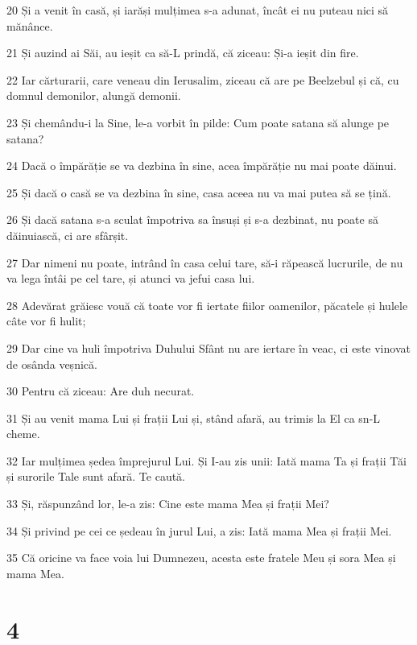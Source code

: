\par 20 Și a venit în casă, și iarăși mulțimea s-a adunat, încât ei nu puteau nici să mănânce.
\par 21 Și auzind ai Săi, au ieșit ca să-L prindă, că ziceau: Și-a ieșit din fire.
\par 22 Iar cărturarii, care veneau din Ierusalim, ziceau că are pe Beelzebul și că, cu domnul demonilor, alungă demonii.
\par 23 Și chemându-i la Sine, le-a vorbit în pilde: Cum poate satana să alunge pe satana?
\par 24 Dacă o împărăție se va dezbina în sine, acea împărăție nu mai poate dăinui.
\par 25 Și dacă o casă se va dezbina în sine, casa aceea nu va mai putea să se țină.
\par 26 Și dacă satana s-a sculat împotriva sa însuși și s-a dezbinat, nu poate să dăinuiască, ci are sfârșit.
\par 27 Dar nimeni nu poate, intrând în casa celui tare, să-i răpească lucrurile, de nu va lega întâi pe cel tare, și atunci va jefui casa lui.
\par 28 Adevărat grăiesc vouă că toate vor fi iertate fiilor oamenilor, păcatele și hulele câte vor fi hulit;
\par 29 Dar cine va huli împotriva Duhului Sfânt nu are iertare în veac, ci este vinovat de osânda veșnică.
\par 30 Pentru că ziceau: Are duh necurat.
\par 31 Și au venit mama Lui și frații Lui și, stând afară, au trimis la El ca sn-L cheme.
\par 32 Iar mulțimea ședea împrejurul Lui. Și I-au zis unii: Iată mama Ta și frații Tăi și surorile Tale sunt afară. Te caută.
\par 33 Și, răspunzând lor, le-a zis: Cine este mama Mea și frații Mei?
\par 34 Și privind pe cei ce ședeau în jurul Lui, a zis: Iată mama Mea și frații Mei.
\par 35 Că oricine va face voia lui Dumnezeu, acesta este fratele Meu și sora Mea și mama Mea.

\chapter{4}

